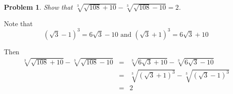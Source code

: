 \documentclass[letterpaper,11pt]{article}
\newtheorem{problem}[theorem]{Problem}
\begin{document}
\begin{problem}
Show that $\sqrt[3]{\sqrt{108} + 10} - \sqrt[3]{\sqrt{108} - 10} = 2$.
\end{problem}

Note that
\[
(\sqrt{3}-1)^3 = 6\sqrt{3} - 10 \mbox{ and } (\sqrt{3}+1)^3 = 6\sqrt{3} + 10
\]

Then
\begin{eqnarray*}
\sqrt[3]{\sqrt{108} + 10} - \sqrt[3]{\sqrt{108} - 10} &=& \sqrt[3]{6\sqrt{3} + 10} - \sqrt[3]{6\sqrt{3} - 10} \\
&=& \sqrt[3]{(\sqrt{3}+1)^3} - \sqrt[3]{(\sqrt{3}-1)^3} \\
&=& 2
\end{eqnarray*}
\end{document}
